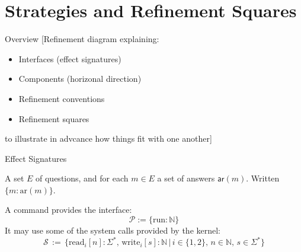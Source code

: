 \documentclass[aspectratio=1610,mathserif]{beamer}
\newcommand{\kw}[1]{\ensuremath{ \mathrm{#1} }}
\begin{document}
\frame{\tableofcontents}

\section{Strategies and Refinement Squares}

\begin{frame}{Overview}
  [Refinement diagram explaining:
   \begin{itemize}
      \item Interfaces (effect signatures)
      \item Components (horizonal direction)
      \item Refinement conventions
      \item Refinement squares
   \end{itemize}
  to illustrate in advcance how things fit with one another]
\end{frame}

\begin{frame}{Effect Signatures}

  \begin{definition}
    A set $E$ of questions, and for each $m \in E$ a set of answers $\mathsf{ar}(m)$. 
    Written $\{ m : \kw{ar}(m) \}$.
  \end{definition}

  \pause
  \begin{example}
    A command provides the interface:
    \[ \mathcal{P} :=  \{ \kw{run} : \mathbb{N} \} \]
    \pause
    It may use some of the system calls provided by the kernel:
    \[
      \mathcal{S} \, := \, \bigl\{
      \kw{read}_i[n] \mathbin: \Sigma^* , \,
      \kw{write}_i[s] \mathbin: \mathbb{N} \, \mathrel{\big|} \,
      i \in \{1,2\}, \,
      n \in \mathbb{N}, \,
      s \in \Sigma^*
      \bigr\}
    \]
  \end{example}
\end{frame}
\end{document}
